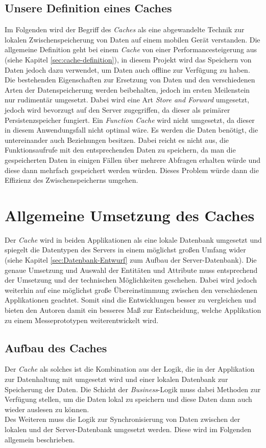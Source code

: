 \subsection{Unsere Definition eines Caches}
\label{ssec:cache-unsere-definition}
Im Folgenden wird der Begriff des \textit{Caches} als eine abgewandelte Technik zur lokalen Zwischenspeicherung von Daten auf einem mobilen Gerät verstanden. Die allgemeine Definition geht bei einem \textit{Cache} von einer Performancesteigerung aus (siehe Kapitel \ref{sec:cache-definition}), in diesem Projekt wird das Speichern von Daten jedoch dazu verwendet, um Daten auch offline zur Verfügung zu haben. Die bestehenden Eigenschaften zur Ersetzung von Daten und den verschiedenen Arten der Datenspeicherung werden beibehalten, jedoch im ersten Meilenstein nur rudimentär umgesetzt. Dabei wird eine Art \textit{Store and Forward} umgesetzt, jedoch wird bevorzugt auf den Server zugegriffen, da dieser als primärer Persistenzspeicher fungiert. Ein \textit{Function Cache} wird nicht umgesetzt, da dieser in diesem Anwendungsfall nicht optimal wäre. Es werden die Daten benötigt, die untereinander auch Beziehungen besitzen. Dabei reicht es nicht aus, die Funktionsaufrufe mit den entsprechenden Daten zu speichern, da man die gespeicherten Daten in einigen Fällen über mehrere Abfragen erhalten würde und diese dann mehrfach gespeichert werden würden. Dieses Problem würde dann die Effizienz des Zwischenspeicherns umgehen.

\section{Allgemeine Umsetzung des Caches}
\label{sec:cache-umsetzung}
Der \textit{Cache} wird in beiden Applikationen als eine lokale Datenbank umgesetzt und spiegelt die Datentypen des Servers in einem möglichst großen Umfang wider (siehe Kapitel \ref{sec:Datenbank-Entwurf} zum Aufbau der Server-Datenbank). Die genaue Umsetzung und Auswahl der Entitäten und Attribute muss entsprechend der Umsetzung und der technischen Möglichkeiten geschehen. Dabei wird jedoch weiterhin auf eine möglichst große Übereinstimmung zwischen den verschiedenen Applikationen geachtet. Somit sind die Entwicklungen besser zu vergleichen und bieten den Autoren damit ein besseres Maß zur Entscheidung, welche Applikation zu einem Messeprototypen weiterentwickelt wird.

\subsection{Aufbau des Caches}
\label{ssec:cache-aufbau}
Der \textit{Cache} als solches ist die Kombination aus der Logik, die in der Applikation zur Datenhaltung mit umgesetzt wird und einer lokalen Datenbank zur Speicherung der Daten. Die Schicht der \textit{Business}-Logik muss dabei Methoden zur Verfügung stellen, um die Daten lokal zu speichern und diese Daten dann auch wieder auslesen zu können.\\
Des Weiteren muss die Logik zur Synchronisierung von Daten zwischen der lokalen und der Server-Datenbank umgesetzt werden. Diese wird im Folgenden allgemein beschrieben.

